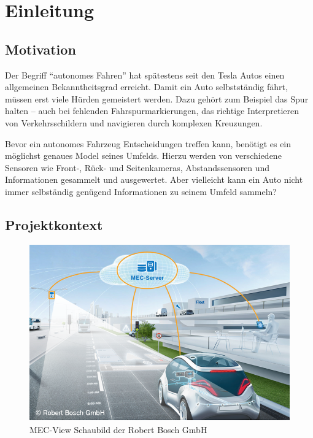 
\chapter{Einleitung}

\section{Motivation}
Der Begriff \enquote{autonomes Fahren} hat spätestens seit den Tesla Autos einen allgemeinen Bekanntheitsgrad erreicht. Damit ein Auto selbstständig fährt, müssen erst viele Hürden gemeistert werden.
Dazu gehört zum Beispiel das Spur halten -- auch bei fehlenden Fahrspurmarkierungen, das richtige Interpretieren von Verkehrsschildern und navigieren durch komplexen Kreuzungen. 

Bevor ein autonomes Fahrzeug Entscheidungen treffen kann, benötigt es ein möglichst genaues Model seines Umfelds.
Hierzu werden von verschiedene Sensoren wie Front-, Rück- und Seitenkameras, Abstandssensoren und  Informationen gesammelt und ausgewertet. Aber vielleicht kann ein Auto nicht immer selbständig genügend Informationen zu seinem Umfeld sammeln? 

\section{Projektkontext}
\begin{figure}[H]
	\label{test 123}
	\centering
	\includegraphics[width=\textwidth]{images/MECView_Schaubild_BoschStyle_V2.png}
	\caption{MEC-View Schaubild der Robert Bosch GmbH \cite{mec:home} {}}
\end{figure}

